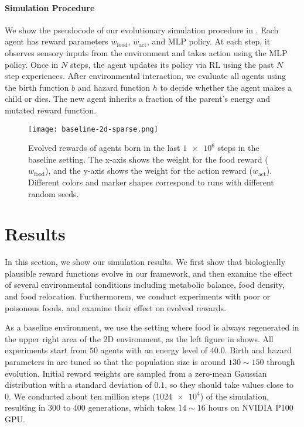 \paragraph{Simulation Procedure}
We show the pseudocode of our evolutionary simulation procedure in . Each agent has reward parameters $w_{\mathrm{food}}$, $w_{\mathrm{act}}$, and MLP policy. At each step, it observes sensory inputs from the environment and takes action using the MLP policy. Once in $N$ steps, the agent updates its policy via RL using the past $N$ step experiences. After environmental interaction, we evaluate all agents using the birth function $b$ and hazard function $h$ to decide whether the agent makes a child or dies. The new agent inherits a fraction of the parent's energy and mutated reward function.

\begin{figure}[t]
  \centering
  \texttt{[image: baseline-2d-sparse.png]}
  \caption{
    Evolved rewards of agents born in the last $\num{1e6}$ steps in the baseline setting.
    The x-axis shows the weight for the food reward ($w_{\mathrm{food}}$), and the y-axis shows the weight for the action reward ($w_{\mathrm{act}}$).
    Different colors and marker shapes correspond to runs with different random seeds.
  }\label{figure:result-baseline}
\end{figure}

\section{Results}
In this section, we show our simulation results. We first show that biologically plausible reward functions evolve in our framework, and then examine the effect of several environmental conditions including metabolic balance, food density, and food relocation. Furthermorem, we conduct experiments with poor or poisonous foods, and examine their effect on evolved rewards.

As a baseline environment, we use the setting where food is always regenerated in the upper right area of the 2D environment, as the left figure in  shows. All experiments start from $50$ agents with an energy level of $40.0$. Birth and hazard parameters in  are tuned so that the population size is around $130\sim 150$ through evolution. Initial reward weights are sampled from a zero-mean Gaussian distribution with a standard deviation of $0.1$, so they should take values close to $0$. We conducted about ten million steps ($\num{1024e4}$) of the simulation, resulting in $300$ to $400$ generations, which takes $14\sim16$ hours on NVIDIA P100 GPU.

